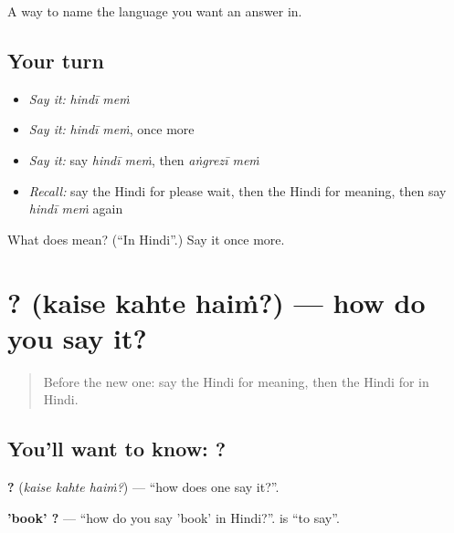 \begin{grammarlens}[title={What you've built}]
A way to name the language you want an answer in.
\end{grammarlens}

\subsection*{Your turn}
\begin{itemize}
\raggedright
  \item \emph{Say it:} \emph{hindī meṁ}
  \item \emph{Say it:} \emph{hindī meṁ}, once more
  \item \emph{Say it:} say \emph{hindī meṁ}, then \emph{aṅgrezī meṁ}
  \item \emph{Recall:} say the Hindi for please wait, then the Hindi for meaning, then say \emph{hindī meṁ} again
\end{itemize}

\begin{tcolorbox}[breakable,colback=teal!4,colframe=teal!35!black,title={Before you move on}]
What does   mean? (\textquotedblleft{}In Hindi\textquotedblright{}.) Say it once more.
\end{tcolorbox}
\section[\texorpdfstring{\hi{कैसे} \hi{कहते} \hi{हैं}? (kaise kahte haiṁ?)}{कैसे कहते हैं? (kaise kahte haiṁ?)}]{  ? (kaise kahte haiṁ?) — how do you say it?}

\label{lesson:HI-C111-kaisekahte}



\begin{quote}
Before the new one: say the Hindi for meaning, then the Hindi for in Hindi.
\end{quote}

\subsection*{You'll want to know:   ?}
\textbf{  ?} (\emph{kaise kahte haiṁ?}) — \textquotedblleft{}how does one say it?\textquotedblright{}.

\textbf{  'book'   ?} — \textquotedblleft{}how do you say 'book' in Hindi?\textquotedblright{}. \textbf{} is \textquotedblleft{}to say\textquotedblright{}.

